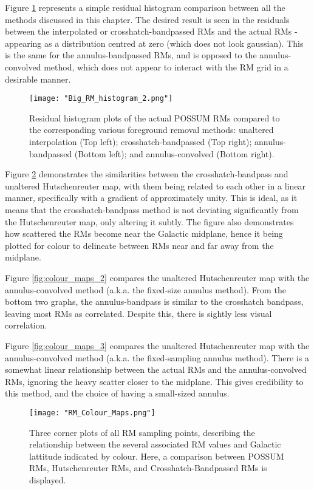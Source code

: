 Figure \ref{fig:big_hist} represents a simple residual histogram comparison between all the methods discussed in this chapter. The desired result is seen in the residuals between the interpolated or crosshatch-bandpassed RMs and the actual RMs - appearing as a distribution centred at zero (which does not look gaussian). This is the same for the annulus-bandpassed RMs, and is opposed to the annulus-convolved method, which does not appear to interact with the RM grid in a desirable manner.

\begin{figure}
    \texttt{[image: "Big\_RM\_histogram\_2.png"]}
    \centering
    \caption{Residual histogram plots of the actual POSSUM RMs compared to the corresponding various foreground removal methods: unaltered interpolation (Top left); crosshatch-bandpassed (Top right); annulus-bandpassed (Bottom left); and annulus-convolved (Bottom right).}
    \label{fig:big_hist}
\end{figure}


Figure \ref{fig:colour_maps_1} demonstrates the similarities between the crosshatch-bandpass and unaltered Hutschenreuter map, with them being related to each other in a linear manner, specifically with a gradient of approximately unity. This is ideal, as it means that the crosshatch-bandpass method is not deviating significantly from the Hutschenreuter map, only altering it subtly. The figure also demonstrates how scattered the RMs become near the Galactic midplane, hence it being plotted for colour to delineate between RMs near and far away from the midplane.

Figure \ref{fig:colour_maps_2} compares the unaltered Hutschenreuter map with the annulus-convolved method (a.k.a. the fixed-size annulus method). From the bottom two graphs, the annulus-bandpass is similar to the crosshatch bandpass, leaving most RMs as correlated. Despite this, there is sightly less visual correlation.


Figure \ref{fig:colour_maps_3} compares the unaltered Hutschenreuter map with the annulus-convolved method (a.k.a. the fixed-sampling annulus method). There is a somewhat linear relationship between the actual RMs and the annulus-convolved RMs, ignoring the heavy scatter closer to the midplane. This gives credibility to this method, and the choice of having a small-sized annulus.


\begin{figure}
    \texttt{[image: "RM\_Colour\_Maps.png"]}
    \centering
    \caption{Three corner plots of all RM sampling points, describing the relationship between the several associated RM values and Galactic lattitude indicated by colour. Here, a comparison between POSSUM RMs, Hutschenreuter RMs, and Crosshatch-Bandpassed RMs is displayed.}
    \label{fig:colour_maps_1}
\end{figure}

